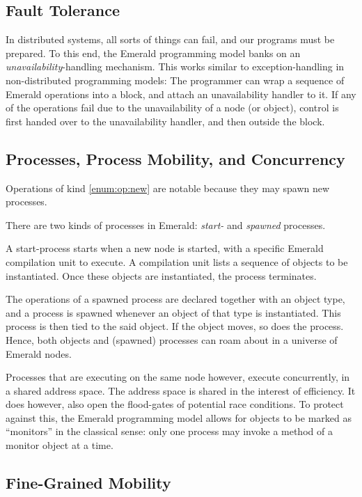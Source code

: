 \subsection*{Fault Tolerance}

In distributed systems, all sorts of things can fail, and our programs
must be prepared. To this end, the Emerald programming model banks on
an \emph{unavailability}-handling mechanism. This works similar to
exception-handling in non-distributed programming models: The
programmer can wrap a sequence of Emerald operations into a block, and
attach an unavailability handler to it. If any of the operations fail
due to the unavailability of a node (or object), control is first
handed over to the unavailability handler, and then outside the block.

\subsection*{Processes, Process Mobility, and Concurrency}

Operations of kind \ref{enum:op:new} are notable because they may
spawn new processes.

There are two kinds of processes in Emerald: \emph{start-} and
\emph{spawned} processes.

A start-process starts when a new node is started, with a specific
Emerald compilation unit to execute. A compilation unit lists a
sequence of objects to be instantiated. Once these objects are
instantiated, the process terminates.

The operations of a spawned process are declared together with an
object type, and a process is spawned whenever an object of that type
is instantiated.  This process is then tied to the said object. If the
object moves, so does the process. Hence, both objects and (spawned)
processes can roam about in a universe of Emerald nodes.

Processes that are executing on the same node however, execute
concurrently, in a shared address space. The address space is shared
in the interest of efficiency. It does however, also open the
flood-gates of potential race conditions. To protect against this, the
Emerald programming model allows for objects to be marked as
``monitors'' in the classical sense: only one process may invoke a
method of a monitor object at a time.

\subsection*{Fine-Grained Mobility}

